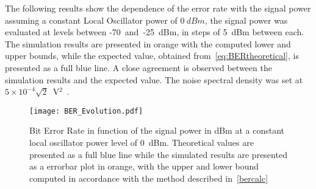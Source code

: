 The following results show the dependence of the error rate with the signal power assuming a constant Local Oscillator power of $0~dBm$, the signal power was evaluated at levels between -70~and~-25~dBm, in steps of 5~dBm between each. The simulation results are presented in orange with the computed lower and upper bounds, while the expected value, obtained from~\eqref{eq:BERtheoretical}, is presented as a full blue line. A close agreement is observed between the simulation results and the expected value. The noise spectral density was set at $5\times10^{-4}\sqrt{2}$~V$^2$~\cite{thorlabs}. 
\begin{figure}[H]
\centering
\texttt{[image: BER\_Evolution.pdf]}
\caption{Bit Error Rate in function of the signal power in dBm at a constant local oscillator power level of 0~dBm. Theoretical values are presented as a full blue line while the simulated results are presented as a errorbar plot in orange, with the upper and lower bound computed in accordance with the method described in~\ref{bercalc}}
\label{fig:berevolution}
\end{figure}


 
